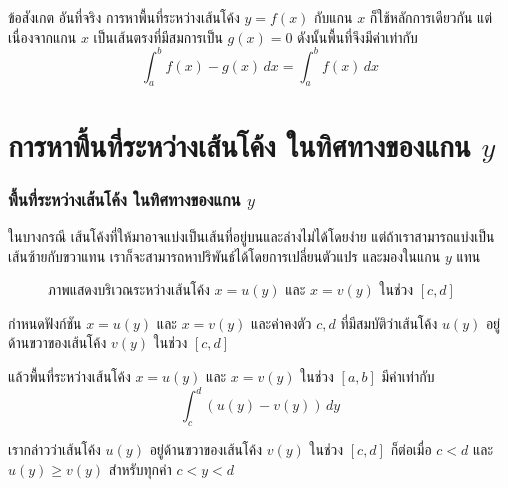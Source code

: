 \begin{frame}
\begin{remark}{ข้อสังเกต}
อันที่จริง การหาพื้นที่ระหว่างเส้นโค้ง $y=f(x)$ กับแกน $x$ ก็ใช้หลักการเดียวกัน แต่เนื่องจากแกน $x$ เป็นเส้นตรงที่มีสมการเป็น $g(x) = 0$ ดังนั้นพื้นที่จึงมีค่าเท่ากับ
\[ \int_a^b f(x) - g(x) \, dx = \int_a^b f(x) \, dx\]
\end{remark}
\end{frame}


\section[ทิศทางของแกน $y$]{การหาพื้นที่ระหว่างเส้นโค้ง ในทิศทางของแกน $y$}
\frame{\sectionpage}

\begin{frame}
\frametitle{พื้นที่ระหว่างเส้นโค้ง ในทิศทางของแกน $y$}
ในบางกรณี เส้นโค้งที่ให้มาอาจแบ่งเป็นเส้นที่อยู่บนและล่างไม่ได้โดยง่าย \pa แต่ถ้าเราสามารถแบ่งเป็นเส้นซ้ายกับขวาแทน เราก็จะสามารถหาปริพันธ์ได้โดยการเปลี่ยนตัวแปร และมองในแกน $y$ แทน \pa

\begin{figure}[h!]
\centering
{}
\caption{ภาพแสดงบริเวณระหว่างเส้นโค้ง $x=u(y)$ และ $x=v(y)$ ในช่วง $[c,d]$}
\end{figure}
\end{frame}

\begin{frame}
\begin{thm}{}{}
กำหนดฟังก์ชัน $x = u(y)$ และ $x = v(y)$ และค่าคงตัว $c, d$ ที่มีสมบัติว่าเส้นโค้ง $u(y)$ อยู่ด้านขวาของเส้นโค้ง $v(y)$ ในช่วง $[c,d]$

แล้วพื้นที่ระหว่างเส้นโค้ง $x = u(y)$ และ $x = v(y)$ ในช่วง $[a,b]$ มีค่าเท่ากับ
\begin{equation} 
\int_c^d ( u(y) -v(y) ) \, dy 
\end{equation}
\end{thm}

เรากล่าวว่าเส้นโค้ง $u(y)$ อยู่ด้านขวาของเส้นโค้ง $v(y)$ ในช่วง $[c,d]$ ก็ต่อเมื่อ $c<d$ และ $u(y) \geq v(y)$ สำหรับทุกค่า $c < y < d$
\end{frame}

